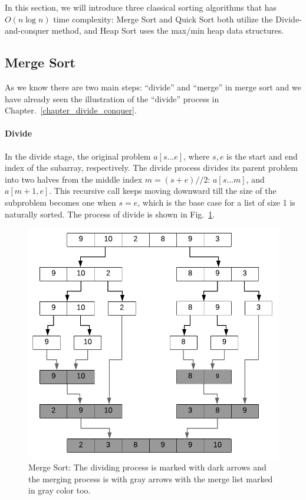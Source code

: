 \documentclass[../main.tex]{subfiles}
\begin{document}
In this section, we will introduce three classical sorting algorithms that has $O(n\log n)$ time complexity: Merge Sort and Quick Sort both utilize the Divide-and-conquer method, and Heap Sort uses the max/min heap data structures.
\subsection{Merge Sort}
As we know there are two main steps: ``divide'' and ``merge'' in merge sort and we have already seen the illustration of the ``divide'' process in Chapter.~\ref{chapter_divide_conquer}. %

\paragraph{Divide} In the divide stage, the original problem $a[s...e]$, where $s, e$ is the start and end index of the subarray, respectively. The divide process divides its parent problem into two halves from the middle index $m = (s+e)//2$: $a[s...m]$, and $a[m+1, e]$. This recursive call keeps moving downward till the size of the subproblem becomes one when $s=e$, which is the base case for a list of size 1  is naturally sorted. The process of divide is shown in Fig.~\ref{fig:merge_sort}.

\begin{figure}[!ht]
    \centering
    \includegraphics[width=0.9\columnwidth]{fig/merge_sort.png}
        \caption{Merge Sort: The dividing process is marked with dark arrows and the merging process is with gray arrows with the merge list marked in gray color too.}
    \label{fig:merge_sort}
\end{figure}
\end{document}
